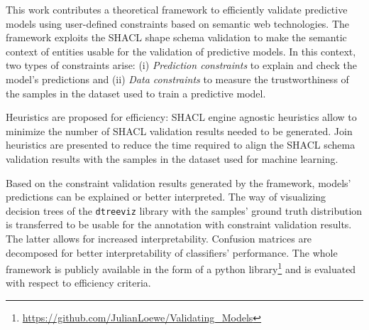 This work contributes a theoretical framework to efficiently validate predictive models using user-defined constraints based on semantic web technologies. The framework exploits the SHACL shape schema validation to make the semantic context of entities usable for the validation of predictive models. In this context, two types of constraints arise:  (i) \emph{Prediction constraints} to explain and check the model's predictions and (ii) \emph{Data constraints} to measure the trustworthiness of the samples in the dataset used to train a predictive model.

Heuristics are proposed for efficiency: SHACL engine agnostic heuristics allow to minimize the number of SHACL validation results needed to be generated. Join heuristics are presented to reduce the time required to align the SHACL schema validation results with the samples in the dataset used for machine learning. 

Based on the constraint validation results generated by the framework, models' predictions can be explained or better interpreted. The way of visualizing decision trees of the \texttt{dtreeviz} library \cite{dtreeviz} with the samples' ground truth distribution is transferred to be usable for the annotation with constraint validation results. The latter allows for increased interpretability. Confusion matrices are decomposed for better interpretability of classifiers' performance. The whole framework is publicly available in the form of a python library\footnote{\href{https://github.com/JulianLoewe/Validating_Models}{https://github.com/JulianLoewe/Validating\_Models}} and is evaluated with respect to efficiency criteria. 


